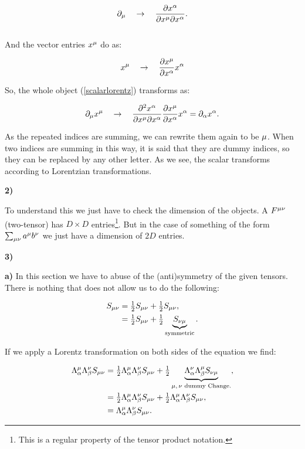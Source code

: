 \begin{equation}
	\partial_{\mu} \quad \rightarrow \quad \frac{\partial x^{\alpha}}{\partial x^{\mu} \partial x^{\alpha}}. 
\end{equation}\\
And the vector entries $x^{\mu}$ do as:

\begin{equation}
	x^{\mu } \quad \rightarrow \quad \frac{\partial x^{\mu}}{\partial x^{\alpha}} x^{\alpha}
\end{equation}

So, the whole object (\ref{scalarlorentz}) transforms as:

\begin{equation}
	\partial_{\mu} x^{\mu}  \quad \rightarrow \quad  \frac{\partial^{2} x^{\alpha}}{\partial x^{\mu} \partial x^{\alpha}} \frac{\partial x^{\mu}}{\partial x^{\alpha}} x^{\alpha} = \partial_{\alpha} x^{\alpha}.
\end{equation}

As the repeated indices are summing, we can rewrite them again to be $\mu$. When two indices are summing in this way, it is said that they are dummy indices, so they can be replaced by any other letter. As we see, the scalar transforms according to Lorentzian transformations.

\textbf{2)}

To understand this we just have to check the dimension of the objects. A $F^{\mu\nu }$ (two-tensor) has $D \times D$ entries\footnote{This is a regular property of the tensor product notation.}. But in the case of something of the form $\sum_{\mu\nu} a^{\mu} b^{\nu}$ we just have a dimension of $ 2D$ entries.

\textbf{3)}

\textbf{a)}
In this section we have to abuse of the (anti)symmetry of the given tensors. There is nothing that does not allow us to do the following:

\begin{equation}
	\begin{split}
			S_{\mu\nu} &= \tfrac{1}{2} S_{\mu\nu} + \tfrac{1}{2} S_{\mu\nu},\\
			&= \tfrac{1}{2} S_{\mu\nu} + \tfrac{1}{2}\underbrace{ S_{\nu\mu}}_{\text{symmetric}}.
	\end{split}
\end{equation}

If we apply a Lorentz transformation on both sides of the equation we find:

\begin{equation}
	\begin{split}
		\Lambda^{\mu}_{\alpha} \Lambda^{\nu}_{\beta}S_{\mu\nu} &= \tfrac{1}{2} 	\Lambda^{\mu}_{\alpha} \Lambda^{\nu}_{\beta}S_{\mu\nu} + \tfrac{1}{2} 	\underbrace{\Lambda^{\nu}_{\alpha} \Lambda^{\mu}_{\beta}S_{\nu\mu}}_{\text{$\mu, \nu$ dummy Change.}},\\
		&= \tfrac{1}{2} 	\Lambda^{\mu}_{\alpha} \Lambda^{\nu}_{\beta}S_{\mu\nu} + \tfrac{1}{2} \Lambda^{\mu}_{\alpha} \Lambda^{\nu}_{\beta}S_{\mu\nu},\\
		&= \Lambda^{\mu}_{\alpha} \Lambda^{\nu}_{\beta}S_{\mu\nu}.\\
	\end{split}
\end{equation}


